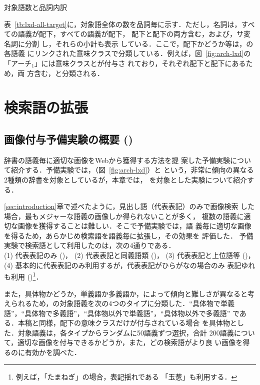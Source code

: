 \documentclass[japanese]{jnlp_1.4}
\newcommand{\izs}[1]{}
\newcommand{\lxd}{}
\newcommand{\wpd}{}
\newcommand{\ano}{}
\newcommand{\mono}{}
\newcommand{\syn}{}
\newcommand{\hyp}{}
\newcommand{\bl}{}
\begin{document}
\begin{table}[b]
\caption{対象語数と品詞内訳}
\label{tb:lxd-all-target}

\end{table}


表~\ref{tb:lxd-all-target}に，対象語全体の数を品詞毎に示す．ただし，名詞は，すべ
ての語義が\izs{1000:抽象}配下，すべての語義が\izs{2:具体}配下，
\izs{1000:抽象}配下と\izs{2:具体}配下の両方含む，および，サ変名詞に分割
し，それらの小計も表示
している．ここで，\izs{2:具体}配下かどうか等は，\lxd{}の各語義
にリンクされた意味クラスで分類している．例えば，図~\ref{fig:arch-lxd}の
「アーチ$_1$」には意味クラス\izs{865:家屋（本体）}と\izs{2435:類型}が付与さ
れており，それぞれ\izs{2:具体}配下と\izs{1000:抽象}配下にあるため，両
方含む，と分類される．



\section{検索語の拡張} \label{sec:make-query}


\subsection{画像付与予備実験の概要 (\ano)}
\label{sec:pre-exp}

辞書の語義毎に適切な画像をWebから獲得する方法を提
案した予備実験について紹介する．予備実験では，\lxd （図~\ref{fig:arch-lxd}）と
\wpd{}という，非常に傾向の異なる2種類の辞書を対象としているが，本章では，
\lxd を対象とした実験について紹介する．

\ref{sec:introduction}章で述べたように，見出し語（代表表記）のみで画像検索
した場合，最もメジャーな語義の画像しか得られないことが多く，
複数の語義に適切な画像を獲得することは難しい．そこで予備実験では，語
義毎に適切な画像を得るため，あらかじめ検索語を語義毎に拡張し，その効果を
評価した．
予備実験で検索語として利用したのは，次の4通りである．\\
(1) 代表表記のみ (\bl)，
(2) 代表表記と同義語類 (\syn)，
(3) 代表表記と上位語等 (\hyp)，
(4) 基本的に代表表記のみ利用するが，代表表記がひらがなの場合のみ
表記ゆれも利用 (\mono)\footnote{例えば，「たまねぎ」の場合，表記揺れである
「玉葱」も利用する．}． 

また，具体物かどうか，単義語か多義語か，によって傾向と難しさが異なると考
えられるため，\lxd{}の対象語義を次の4つのタイプに分類した．``具体物で単義
語''，``具体物で多義語''，``具体物以外で単義語''，``具体物以外で多義語''
である．本稿と同様，\izs{2:具体}配下の意味クラスだけが付与されている場合
を具体物とした．対象語義は，各タイプからランダムに50語義ずつ選択，合計
200語義について，適切な画像を付与できるかどうか，また，どの検索語がより良
い画像を得るのに有効かを調べた．
\end{document}
